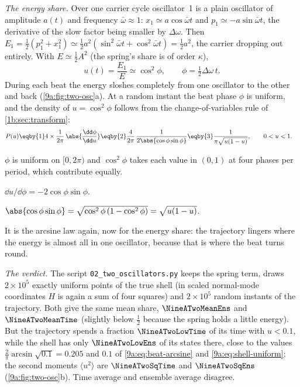 \emph{The energy share.} Over one carrier cycle oscillator~1 is a plain oscillator of
amplitude $a(t)$ and frequency $\bar\omega\approx1$: $x_1\simeq a\cos\bar\omega t$ and
$p_1\simeq-a\sin\bar\omega t$, the derivative of the slow factor being smaller by
$\Delta\omega$. Then
$E_1=\tfrac12(p_1^2+x_1^2)\simeq\tfrac12a^2(\sin^2\bar\omega t+\cos^2\bar\omega t)=\tfrac12a^2$,
the carrier dropping out entirely. With $E\simeq\tfrac12A^2$ (the spring's share is of order
$\kappa$),
\begin{equation}
  u(t)=\frac{E_1}{E}\simeq\cos^2\phi,\qquad \phi=\tfrac12\Delta\omega\,t .
\end{equation}
During each beat the energy sloshes completely from one oscillator to the other and back
(\cref{9a:fig:two-osc}a). At a random instant the beat phase $\phi$ is uniform, and the density
of $u=\cos^2\phi$ follows from the change-of-variables rule of \cref{1b:sec:transform}:
\begin{align}
  P(u)
  &\eqby{1} 4\times\frac{1}{2\pi}\,\abs{\frac{\dd\phi}{\dd u}}
   \eqby{2} \frac{4}{2\pi}\,\frac{1}{2\abs{\cos\phi\sin\phi}}
   \eqby{3} \frac{1}{\pi\sqrt{u(1-u)}},\qquad 0<u<1 .
  \label{9a:eq:beat-arcsine}
\end{align}
\begin{explain}
  \item $\phi$ is uniform on $[0,2\pi)$ and $\cos^2\phi$ takes each value in $(0,1)$ at four
        phases per period, which contribute equally.
  \item $\dd u/\dd\phi=-2\cos\phi\sin\phi$.
  \item $\abs{\cos\phi\sin\phi}=\sqrt{\cos^2\phi\,(1-\cos^2\phi)}=\sqrt{u(1-u)}$.
\end{explain}
It is the arcsine law again, now for the energy share: the trajectory lingers where the
energy is almost all in one oscillator, because that is where the beat turns round.

\emph{The verdict.} The script \texttt{02\_two\_oscillators.py} keeps the spring term, draws
$2\times10^5$ exactly uniform points of the true shell (in scaled normal-mode coordinates $H$ is
again a sum of four squares) and $2\times10^5$ random instants of the trajectory. Both give
the same mean share, $\NineATwoMeanEns$ and $\NineATwoMeanTime$ (slightly below $\tfrac12$
because the spring holds a little energy). But the trajectory spends a fraction
$\NineATwoLowTime$ of its time with $u<0.1$, while the shell has only $\NineATwoLowEns$ of its
states there, close to the values $\tfrac2\pi\arcsin\sqrt{0.1}=0.205$ and $0.1$ of
\eqref{9a:eq:beat-arcsine} and \eqref{9a:eq:shell-uniform}; the second moments
$\langle u^2\rangle$ are $\NineATwoSqTime$ and $\NineATwoSqEns$ (\cref{9a:fig:two-osc}b).
Time average and ensemble average disagree.

